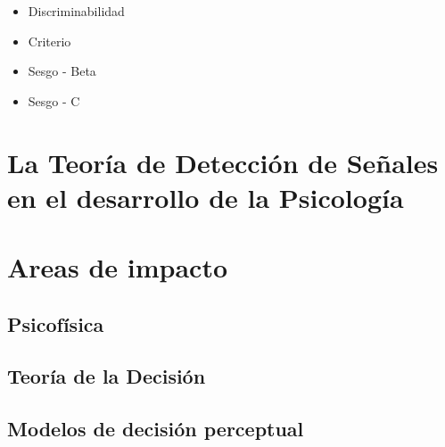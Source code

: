 \begin{itemize}
\item Discriminabilidad
\item Criterio
\item Sesgo - Beta
\item Sesgo - C
\end{itemize}


\section{La Teoría de Detección de Señales en el desarrollo de la Psicología}



\section{Areas de impacto}

\subsection{Psicofísica}

\subsection{Teoría de la Decisión}

\subsection{Modelos de decisión perceptual}

